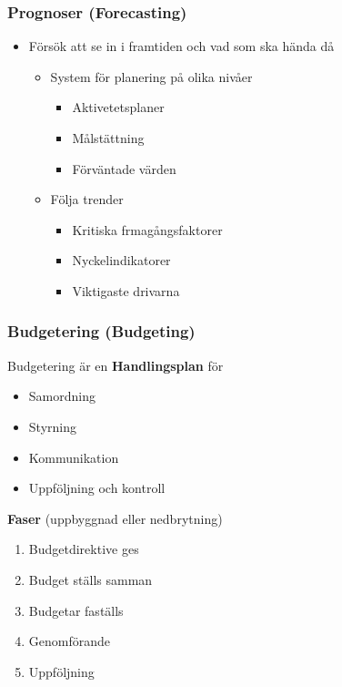 \begin{multicols}{2}
\subsubsection{Prognoser (Forecasting)}
\begin{itemize}
    \item Försök att se in i framtiden och vad som ska hända då 
    \begin{itemize}
        \item System för planering på olika nivåer
        \begin{itemize}
            \item Aktivetetsplaner
            \item Målstättning
            \item Förväntade värden
        \end{itemize}
        \item Följa trender
        \begin{itemize}
            \item Kritiska frmagångsfaktorer
            \item Nyckelindikatorer
            \item Viktigaste drivarna
        \end{itemize}
    \end{itemize}
\end{itemize}

\subsubsection{Budgetering (Budgeting)}
Budgetering är en \textbf{Handlingsplan} för 
\begin{itemize}
    \item Samordning
    \item Styrning
    \item Kommunikation
    \item Uppföljning och kontroll
\end{itemize}

\textbf{Faser} (uppbyggnad eller nedbrytning)
\begin{enumerate}
    \item Budgetdirektive ges
    \item Budget ställs samman 
    \item Budgetar faställs
    \item Genomförande
    \item Uppföljning
\end{enumerate}


\end{multicols}
